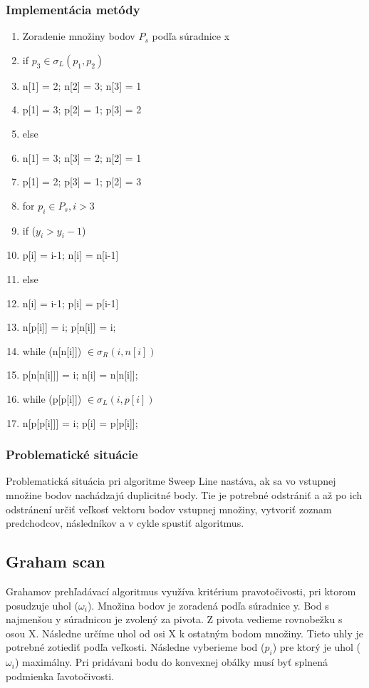 \documentclass[12pt]{article}
\begin{document}
\subsubsection{Implementácia metódy}
\begin{enumerate}
	\item  Zoradenie množiny bodov $P_s$ podľa súradnice x
	\item if $p_3 \in \sigma_L (p_1, p_2)$
	\item \hspace {1.5cm} n[1] = 2; n[2] = 3; n[3] = 1
	\item \hspace {1.5cm} p[1] = 3; p[2] = 1; p[3] = 2
	\item else
	\item \hspace {1.5cm} n[1] = 3; n[3] = 2; n[2] = 1
	\item \hspace {1.5cm} p[1] = 2; p[3] = 1; p[2] = 3
	\item for $p_i \in P_s, i > 3$
	\item \hspace {1.5cm} if ($y_i>y_i-1$) 
	\item \hspace {2.5cm} p[i] = i-1; n[i] = n[i-1]
	\item \hspace {1.5cm} else 
	\item \hspace {2.5cm} n[i] = i-1; p[i] = p[i-1]
	\item \hspace {1.5cm}n[p[i]] = i; p[n[i]] = i;
	\item \hspace {1.5cm}while (n[n[i]]) $\in \sigma_R (i, n[i]) $
	\item \hspace {2.5cm} p[n[n[i]]] = i; n[i] = n[n[i]];
	\item \hspace {1.5cm} while (p[p[i]]) $\in \sigma_L (i, p[i]) $
	\item \hspace {2.5cm} n[p[p[i]]] = i; p[i] = p[p[i]];
\end{enumerate}
\subsubsection{Problematické situácie}
Problematická situácia pri algoritme Sweep Line nastáva, ak sa vo vstupnej množine bodov nachádzajú duplicitné body. Tie je potrebné odstrániť a až po ich odstránení určiť veľkosť vektoru bodov vstupnej množiny, vytvoriť zoznam predchodcov,  následníkov a v cykle spustiť algoritmus.

\subsection {Graham scan}
Grahamov prehľadávací algoritmus využíva kritérium pravotočivosti, pri ktorom posudzuje uhol  ($\omega_i$). Množina bodov je zoradená podľa súradnice y. Bod s najmenšou y súradnicou je zvolený za pivota. Z pivota vedieme rovnobežku s osou X. Následne určíme uhol od osi X k ostatným bodom množiny. Tieto uhly je potrebné zotiediť podľa veľkosti. Následne vyberieme bod  ($p_i$) pre ktorý je uhol  ($\omega_i$) maximálny. Pri pridávani bodu do konvexnej obálky musí byť splnená podmienka ľavotočivosti.
\end{document}
